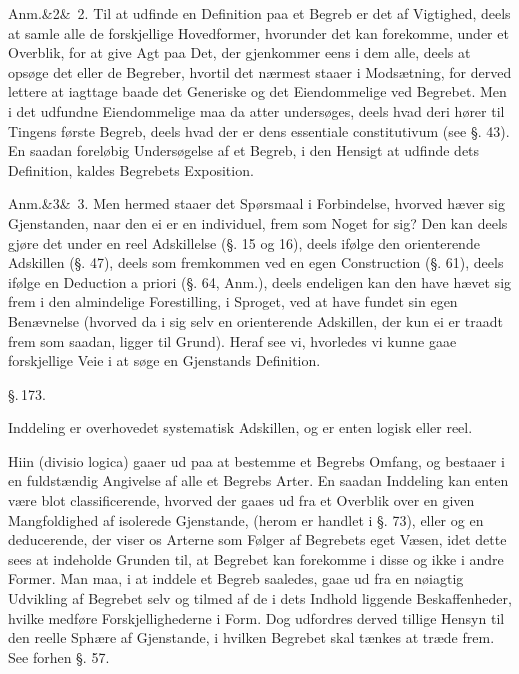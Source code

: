 \documentclass[12pt]{book}
\def\sperr#1{#1}%
\def\textit#1{#1}%
\def\emph#1{#1}%
\newcommand{\sperr}[1]{\textls[180]{#1}}
\newcommand{\parag}[1]{%
  \par\vspace{0.9\baselineskip}%
  {\centering\textit{\S.\,#1.}\par}%
  \vspace{0.35\baselineskip}%
  \noindent\hspace{\parindent}\ignorespaces
}
\newcommand{\anm}[1]{%
  \par\vspace{0.5\baselineskip}%
  \noindent\hspace{\parindent}\sperr{Anm.}\ifx&#1&\else~\textit{#1}.\fi
  \enspace\ignorespaces
}
\newcommand{\opage}[1]{\marginnote{\footnotesize\textit{[#1]}}}
\begin{document}
\anm{2} Til at udfinde en Definition paa et Begreb er det af Vigtighed,
deels at samle alle de forskjellige Hovedformer, hvorunder det kan
forekomme, under et Overblik, for at give Agt paa Det, der gjenkommer eens i
dem alle, deels
\opage{374} at opsøge det eller de Begreber, hvortil det nærmest staaer i
\emph{Modsætning}, for derved lettere at iagttage baade det Generiske og det
Eiendommelige ved Begrebet. Men i det udfundne Eiendommelige maa da atter
undersøges, deels hvad deri hører til Tingens første Begreb, deels hvad der
er dens \textit{essentiale constitutivum} (see §. 43). En saadan foreløbig
Undersøgelse af et Begreb, i den Hensigt at udfinde dets Definition, kaldes
Begrebets \emph{Exposition}.

\anm{3} Men hermed staaer det Spørsmaal i Forbindelse, hvorved hæver sig
Gjenstanden, naar den ei er en individuel, frem som Noget for sig? Den kan
deels gjøre det under en \emph{reel Adskillelse} (§. 15 og 16), deels ifølge
den \emph{orienterende Adskillen} (§. 47), deels som fremkommen ved en egen
\emph{Construction} (§. 61), deels ifølge en \emph{Deduction}
\textit{a priori} (§. 64, Anm.), deels endeligen kan den have hævet sig frem
i den almindelige Forestilling, i Sproget, ved at have fundet sin egen
Benævnelse (hvorved da i sig selv en \emph{orienterende Adskillen}, der kun
ei er traadt frem som saadan, ligger til Grund). Heraf see vi, hvorledes vi
kunne gaae forskjellige Veie i at søge en Gjenstands Definition.

\parag{173}

Inddeling er overhovedet \emph{systematisk Adskillen}, og er enten
\emph{logisk} eller \emph{reel}.

Hiin (\textit{divisio logica}) gaaer ud paa at bestemme et Begrebs Omfang,
og bestaaer i en fuldstændig Angivelse af alle et Begrebs Arter.
\opage{375} En saadan Inddeling kan enten være blot \emph{classificerende}, hvorved der
gaaes ud fra et Overblik over en given Mangfoldighed af isolerede
Gjenstande, (herom er handlet i §. 73), eller og en \emph{deducerende}, der
viser os Arterne som Følger af Begrebets eget Væsen, idet dette sees at
indeholde Grunden til, at Begrebet kan forekomme i disse og ikke i andre
Former. Man maa, i at inddele et Begreb saaledes, gaae ud fra en nøiagtig
Udvikling af Begrebet selv og tilmed af de i dets Indhold liggende
Beskaffenheder, hvilke medføre Forskjellighederne i Form. Dog udfordres
derved tillige Hensyn til den reelle Sphære af Gjenstande, i hvilken
Begrebet skal tænkes at træde frem. See forhen §. 57.
\end{document}
